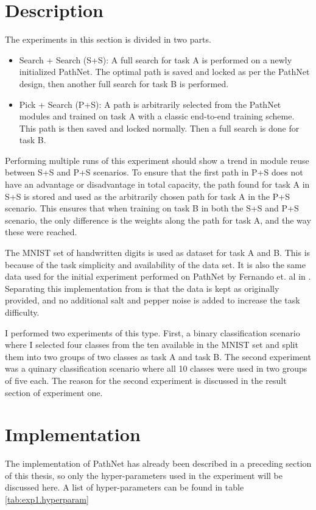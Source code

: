 \section{Description}
The experiments in this section is divided in two parts. 
\begin{itemize}
    \item Search + Search (S+S): A full search for task A is performed on a newly initialized PathNet. The optimal path is saved and locked as per the PathNet design, then another full search for task B is performed.
    \item Pick + Search (P+S): A path is arbitrarily selected from the PathNet modules and trained on task A with a classic end-to-end training scheme. This path is then saved and locked normally. Then a full search is done for task B.
\end{itemize}
Performing multiple runs of this experiment should show a trend in module reuse between S+S and P+S scenarios. To ensure that the first path in P+S does not have an advantage or disadvantage in total capacity,  the path found for task A in S+S is stored and used as the arbitrarily chosen path for task A in the P+S scenario. This ensures that when training on task B in both the S+S and P+S scenario, the only difference is the weights along the path for task A, and the way these were reached. 

The MNIST set of handwritten digits is used as dataset for task A and B. This is because of the task simplicity and availability of the data set. 
It is also the same data used for the initial experiment performed on PathNet by Fernando et. al in \cite{pathnet}. Separating this implementation from \cite{pathnet} is that the data is kept as originally provided, and no additional salt and pepper noise is added to increase the task difficulty. 


I performed two experiments of this type. First, a binary classification scenario where I selected four classes from the ten available in the MNIST set and split them into two groups of two classes as task A and task B. The second experiment was a quinary classification scenario where all 10 classes were used in two groups of five each. The reason for the second experiment is discussed in the result section of experiment one. 

\section{Implementation}\label{exp1:implementation}
The implementation of PathNet has already been described in a preceding section of this thesis, so only the hyper-parameters used in the experiment will be discussed here. A list of hyper-parameters can be found in table \ref{tab:exp1.hyperparam}

